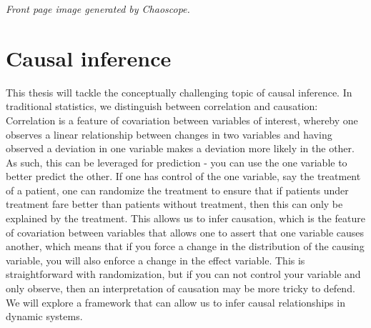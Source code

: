 \documentclass[11pt, a4paper]{memoir}
\subtitle{Convergent Cross Mapping and Alternative Approaches}
\theoremstyle{plain}
\theoremstyle{definition}
\begin{document}
\begingroup
  \selectfont
  \maketitle
  \textit{Front page image generated by Chaoscope.}
\endgroup

\tableofcontents

\normalem

\section{Causal inference}
This thesis will tackle the conceptually challenging topic of causal inference. In traditional statistics, we distinguish between correlation and causation: Correlation is a feature of covariation between variables of interest, whereby one observes a linear relationship between changes in two variables and having observed a deviation in one variable makes a deviation more likely in the other. As such, this can be leveraged for prediction - you can use the one variable to better predict the other. If one has control of the one variable, say the treatment of a patient, one can randomize the treatment to ensure that if patients under treatment fare better than patients without treatment, then this can only be explained by the treatment. This allows us to infer causation, which is the feature of covariation between variables that allows one to assert that one variable causes another, which means that if you force a change in the distribution of the causing variable, you will also enforce a change in the effect variable. This is straightforward with randomization, but if you can not control your variable and only observe, then an interpretation of causation may be more tricky to defend. We will explore a framework that can allow us to infer causal relationships in dynamic systems.
\end{document}
